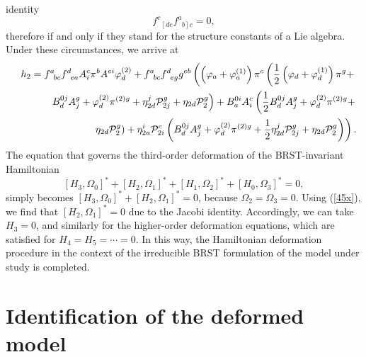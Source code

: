 \documentclass[a4paper,12pt]{article}
\begin{document}
identity 
\begin{equation}
f_{\;\;\left[ de\right. }^{c}f_{\;\;\left. b\right] c}^{a}=0,  \label{44x}
\end{equation}
therefore if and only if they stand for the structure constants of a Lie
algebra. Under these circumstances, we arrive at 
\begin{eqnarray}
&&h_{2}=f_{\;\;bc}^{a}f_{\;\;ea}^{d}A_{i}^{c}\pi ^{b}A^{ei}\varphi
_{d}^{\left( 2\right) }+f_{\;\;bc}^{a}f_{\;\;eg}^{d}g^{eb}\left( \left(
\varphi _{a}+\varphi _{a}^{\left( 1\right) }\right) \pi ^{c}\left( \frac{1}{2%
}\left( \varphi _{d}+\varphi _{d}^{\left( 1\right) }\right) \pi ^{g}+\right.
\right.  \nonumber \\
&&\left. B_{d}^{0j}A_{j}^{g}+\varphi _{d}^{\left( 2\right) }\pi ^{\left(
2\right) g}+\eta _{2d}^{j}\mathcal{P}_{2j}^{g}+\eta _{2d}\mathcal{P}%
_{2}^{g}\right) +B_{a}^{0i}A_{i}^{c}\left( \frac{1}{2}B_{d}^{0j}A_{j}^{g}+%
\varphi _{d}^{\left( 2\right) }\pi ^{\left( 2\right) g}+\right.  \nonumber \\
&&\left. \left. \eta _{2d}\mathcal{P}_{2}^{g}\right) +\eta _{2a}^{i}\mathcal{%
P}_{2i}^{c}\left( B_{d}^{0j}A_{j}^{g}+\varphi _{d}^{\left( 2\right) }\pi
^{\left( 2\right) g}+\frac{1}{2}\eta _{2d}^{j}\mathcal{P}_{2j}^{g}+\eta _{2d}%
\mathcal{P}_{2}^{g}\right) \right) .  \label{45x}
\end{eqnarray}
The equation that governs the third-order deformation of the BRST-invariant
Hamiltonian 
\begin{equation}
\left[ H_{3},\Omega _{0}\right] ^{*}+\left[ H_{2},\Omega _{1}\right]
^{*}+\left[ H_{1},\Omega _{2}\right] ^{*}+\left[ H_{0},\Omega _{3}\right]
^{*}=0,  \label{46x}
\end{equation}
simply becomes $\left[ H_{3},\Omega _{0}\right] ^{*}+\left[ H_{2},\Omega
_{1}\right] ^{*}=0$, because $\Omega _{2}=\Omega _{3}=0$. Using (\ref{45x}),
we find that $\left[ H_{2},\Omega _{1}\right] ^{*}=0$ due to the Jacobi
identity. Accordingly, we can take $H_{3}=0$, and similarly for the
higher-order deformation equations, which are satisfied for $%
H_{4}=H_{5}=\cdots =0$. In this way, the Hamiltonian deformation procedure
in the context of the irreducible BRST formulation of the model under study
is completed.

\section{Identification of the deformed model}
\end{document}
